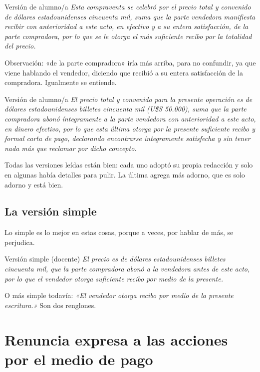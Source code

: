 \documentclass[12pt,oneside]{book}
\begin{document}
\begin{example}{Versión de alumno/a}
\textit{Esta compraventa se celebró por el precio total y convenido de dólares estadounidenses cincuenta mil, suma que la parte vendedora manifiesta recibir con anterioridad a este acto, en efectivo y a su entera satisfacción, de la parte compradora, por lo que se le otorga el más suficiente recibo por la totalidad del precio.}
\end{example}

Observación: «de la parte compradora» iría más arriba, para no confundir, ya que viene hablando el vendedor, diciendo que recibió a su entera satisfacción de la compradora. Igualmente se entiende.

\begin{example}{Versión de alumno/a}
\textit{El precio total y convenido para la presente operación es de dólares estadounidenses billetes cincuenta mil (U\$S 50.000), suma que la parte compradora abonó íntegramente a la parte vendedora con anterioridad a este acto, en dinero efectivo, por lo que esta última otorga por la presente suficiente recibo y formal carta de pago, declarando encontrarse íntegramente satisfecha y sin tener nada más que reclamar por dicho concepto.}
\end{example}

Todas las versiones leídas están bien: cada uno adoptó su propia redacción y solo en algunas había detalles para pulir. La última agrega más adorno, que es solo adorno y está bien.

\subsection{La versión simple}

Lo simple es lo mejor en estas cosas, porque a veces, por hablar de más, se perjudica.

\begin{example}{Versión simple (docente)}
\textit{El precio es de dólares estadounidenses billetes cincuenta mil, que la parte compradora abonó a la vendedora antes de este acto, por lo que el vendedor otorga suficiente recibo por medio de la presente.}

O más simple todavía: \textit{«El vendedor otorga recibo por medio de la presente escritura.»} Son dos renglones.
\end{example}

\section{Renuncia expresa a las acciones por el medio de pago}
\end{document}
